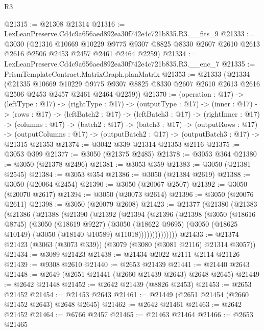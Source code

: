 \begin{lexlean}{R3}
\begin{coremodule}
@21315 := @21308 @21314
@21316 := LexLeanPreserve.Cd4c9a656aed892ea30f742e4c721b835.R3.__fits_9
@21333 := @3030
    (@21316
      @10669
      @10229
      @9775
      @9307
      @8825
      @8330
      @2607
      @2610
      @2613
      @2616
      @2506
      @2453
      @2457
      @2461
      @2464
      @2259)
@21334 := LexLeanPreserve.Cd4c9a656aed892ea30f742e4c721b835.R3.__enc_7
@21335 := PrismTemplateContract.MatrixGraph.planMatrix
@21353 := @21333
    (@21334
      (@21335
        @10669
        @10229
        @9775
        @9307
        @8825
        @8330
        @2607
        @2610
        @2613
        @2616
        @2506
        @2453
        @2457
        @2461
        @2464
        @2259))
@21370 := (operation : @17) ->
  (leftType : @17) ->
  (rightType : @17) ->
  (outputType : @17) ->
  (inner : @17) ->
  (rows : @17) ->
  (leftBatch2 : @17) ->
  (leftBatch3 : @17) ->
  (rightInner : @17) ->
  (columns : @17) ->
  (batch2 : @17) ->
  (batch3 : @17) ->
  (outputRows : @17) ->
  (outputColumns : @17) -> (outputBatch2 : @17) -> (outputBatch3 : @17) -> @21315 @21353
@21374 := @3042 @339 @21314 @21353 @2116
@21375 := @3053 @399
@21377 := @3050 (@21375 @2485)
@21378 := @3053 @364
@21380 := @3050 (@21378 @2496)
@21381 := @3053 @359
@21383 := @3050 (@21381 @2545)
@21384 := @3053 @354
@21386 := @3050 (@21384 @2619)
@21388 := @3050 (@20064 @2454)
@21390 := @3050 (@20067 @2507)
@21392 := @3050 (@20070 @2617)
@21394 := @3050 (@20073 @2614)
@21396 := @3050 (@20076 @2611)
@21398 := @3050 (@20079 @2608)
@21423 := @21377
    (@21380
      (@21383
        (@21386
          (@21388
            (@21390
              (@21392
                (@21394
                  (@21396
                    (@21398
                      (@3050
                        (@18616 @8745)
                        (@3050
                          (@18619 @9227)
                          (@3050
                            (@18622 @9695)
                            (@3050 (@18625 @10149) (@3050 (@18140 @10589) @11018))))))))))))))
@21433 := @21374 @21423 (@3063 (@3073 @339)) (@3079 (@3080 (@3081 @2116) @21314 @3057))
@21434 := @3089 @21423
@21438 := @21434 @2022 @2111 @2114 @21126
@21439 := @9308 @2610
@21440 := @2653 @21439
@21441 := @21440 @2643
@21448 := @2649 (@2651 @21441 (@2660 @21439 @2643) @2648 @2645)
@21449 := @2642 @21448
@21452 := @2642 @21439 (@8826 @2453)
@21453 := @2653 @21452
@21454 := @21453 @2643
@21461 := @21449 (@2651 @21454 (@2660 @21452 @2643) @2648 @2645)
@21462 := @2642 @21461
@21463 := @2642 @21452
@21464 := @6766 @2457
@21465 := @21463 @21464
@21466 := @2653 @21465

\end{coremodule}
\end{lexlean}
